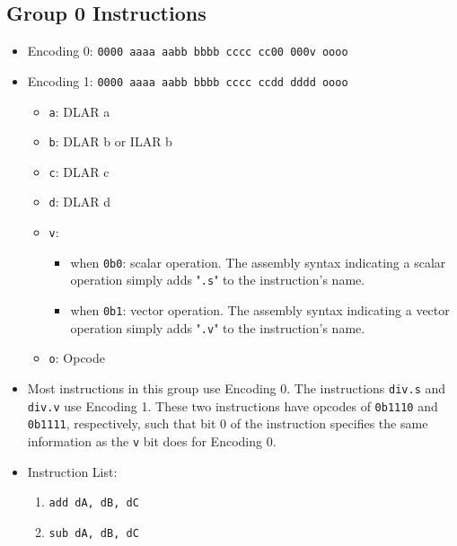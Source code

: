 \documentclass{article}
\begin{document}
	\subsection{Group 0 Instructions}
		\begin{itemize}
		\item Encoding 0: \texttt{0000 aaaa aabb bbbb  cccc cc00 000v oooo}
		\item Encoding 1: \texttt{0000 aaaa aabb bbbb  cccc ccdd dddd oooo}
			\begin{itemize}
			\item \texttt{a}: DLAR a
			\item \texttt{b}: DLAR b or ILAR b
			\item \texttt{c}: DLAR c
			\item \texttt{d}: DLAR d
			\item \texttt{v}:
				\begin{itemize}
				\item when \texttt{0b0}: scalar operation. The assembly
					syntax indicating a scalar operation simply adds
					"\texttt{.s}" to the instruction's name.
				\item when \texttt{0b1}: vector operation. The assembly
					syntax indicating a vector operation simply adds
					"\texttt{.v}" to the instruction's name.
				\end{itemize}
			\item \texttt{o}: Opcode
			\end{itemize}
		\item Most instructions in this group use Encoding 0.
			The instructions \texttt{div.s} and \texttt{div.v} use Encoding
			1. These two instructions have opcodes of \texttt{0b1110} and
			\texttt{0b1111}, respectively, such that bit 0 of the
			instruction specifies the same information as the \texttt{v}
			bit does for Encoding 0.
		\item Instruction List:
			\begin{enumerate}
			\item \texttt{add dA, dB, dC}
			\item \texttt{sub dA, dB, dC}

\end{enumerate}
\end{itemize}
\end{document}

